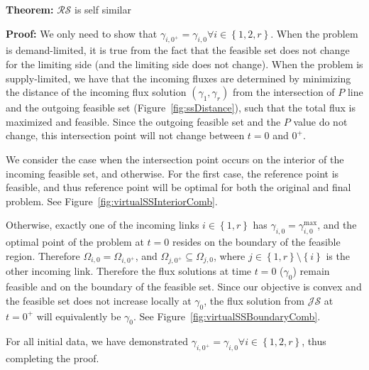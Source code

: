 \textbf{Theorem: }$\mathcal{RS}$ is self similar

\textbf{Proof:} We only need to show that $\gamma_{i,0^{+}}=\gamma_{i,0}\forall i\in\left\{ 1,2,r\right\} $.
When the problem is demand-limited, it is true from the fact that
the feasible set does not change for the limiting side (and the limiting
side does not change). When the problem is supply-limited, we have
that the incoming fluxes are determined by minimizing the distance of the incoming flux solution $\left(\gamma_{1},\gamma_{r}\right)$ from the intersection of $P$ line and the outgoing feasible set (Figure~\ref{fig:ssDistance}),
such that the total flux is maximized and feasible. Since the outgoing
feasible set and the $P$ value do not change, this intersection point
will not change between $t=0$ and $0^{+}$.

We consider the case when the intersection point occurs on the interior
of the incoming feasible set, and otherwise. For the first case, the
reference point is feasible, and thus reference point will be optimal
for both the original and final problem. See Figure~\ref{fig:virtualSSInteriorComb}.

Otherwise, exactly one of the incoming links $i\in\left\{ 1,r\right\} $
has $\gamma_{i,0}=\gamma_{i,0}^{\max}$, and the optimal point of
the problem at $t=0$ resides on the boundary of the feasible region.
Therefore $\Omega_{i,0}=\Omega_{i,0^{+}}$, and $\Omega_{j,0^{+}}\subseteq\Omega_{j,0}$,
where $j\in\left\{ 1,r\right\} \setminus\left\{ i\right\} $ is the
other incoming link. Therefore the flux solutions at time $t=0$ ($\gamma_0$) remain
feasible and on the boundary of the feasible set. Since our objective
is convex and the feasible set does not increase locally at $\gamma_{0}$,
the flux solution from $\mathcal{JS}$ at $t=0^{+}$ will equivalently
be $\gamma_{0}$. See Figure~\ref{fig:virtualSSBoundaryComb}.

For all initial data, we have demonstrated $\gamma_{i,0^{+}}=\gamma_{i,0}\forall i\in\left\{ 1,2,r\right\} $,
thus completing the proof.


